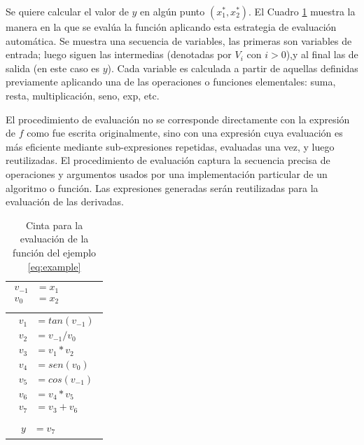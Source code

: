 Se quiere calcular el valor de $y$ en algún punto $(x_{1}^{*},x_{2}^{*})$.
El Cuadro \ref{tab:table1} muestra la manera en la que se evalúa la función aplicando esta estrategia de evaluación automática. Se muestra una secuencia de variables, las primeras son variables de entrada; luego siguen las intermedias (denotadas por $V_{i}$ con $i>0$),y al final las de salida (en este caso es $y$). Cada variable es calculada a partir de aquellas definidas previamente aplicando una de las operaciones o funciones elementales: suma, resta, multiplicación, seno, exp, etc.

El procedimiento de evaluación no se corresponde directamente con la expresión de $f$ como fue escrita originalmente, sino con una expresión cuya evaluación es más eficiente mediante sub-expresiones repetidas, evaluadas una vez, y luego reutilizadas. El procedimiento de evaluación captura la secuencia precisa de operaciones y argumentos usados por una implementación particular de un algoritmo o función. Las expresiones generadas serán reutilizadas para la evaluación de las derivadas.

\begin{table}[h]
\begin{center}
\begin{tabular}{|l|} \hline
			$\begin{aligned}
			v_{-1} & = x_{1}	   \\
			v_{0}  & = x_{2}\\
			\end{aligned}$   	
			\\ \hline
			
			$\begin{aligned}
			\ \ v_{1} & = tan(v_{-1})   \\
			\ \ v_{2} & = v_{-1}/v_{0}  \\
			\ \ v_{3} & = v_{1}*v_{2}   \\
			\ \ v_{4} & = sen(v_{0})   \\
			\ \ v_{5} & = cos(v_{-1}) \\
			\ \ v_{6} & = v_{4}*v_{5} \\
			\ \ v_{7} & = v_{3}+v_{6}\\
			\end{aligned}$
			\\ \hline
			$\begin{aligned}
			\ \ \ y &= v_{7} 
			\end{aligned}$
			\\ \hline
\end{tabular}
		\caption{Cinta para la evaluación de la función del ejemplo \ref{eq:example}}
		\label{tab:table1}
\end{center}
\end{table}

